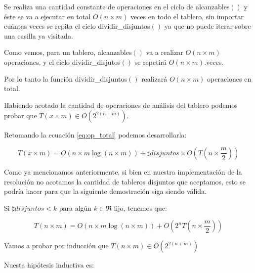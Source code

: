 \documentclass[a4paper, 12pt] {article}
\begin{document}
Se realiza una cantidad constante de operaciones en el ciclo de alcanzables$\left( \right) $ y \'este se va a ejecutar en total $O\left( n\times m\right) $ veces en todo el tablero, sin importar cu\'antas veces se repita el ciclo dividir\_disjuntos$\left( \right) $ ya que no puede iterar sobre una casilla ya visitada.

Como vemos, para un tablero, alcanzables$\left( \right) $ va a realizar $O\left( n \times m\right) $ operaciones, y el ciclo dividir\_disjutos$\left( \right) $ se repetir\'a $O\left( n\times m\right) $.veces.

Por lo tanto la funci\'on dividir\_disjuntos$\left( \right) $ realizar\'a $O\left( n \times m\right) $ operaciones en total.	


Habiendo acotado la cantidad de operaciones de an\'alisis del tablero podemos probar que $T\left( x \times m\right) \in O\left( 2^{2\left( n+m\right) }\right) $.

Retomando la ecuaci\'on \ref{eq:op_total} podemos desarrollarla:

\begin{equation}
T\left( x \times m\right) = O\left( n\times m \log \left( n\times m\right) \right) + \sharp disjuntos \times O \left( T\left( n \times \frac{m}{2} \right) \right) 
\end{equation}
 

Como ya mencionamos anteriormente, si bien en nuestra implementaci\'on de la resoluci\'on no acotamos la cantidad de tableros disjuntos que aceptamos, esto se podr\'ia hacer para que la siguiente demostraci\'on siga siendo v\'alida.


Si $\sharp disjuntos < k$ para alg\'un  $k \in \Re$  fijo, tenemos que:

\begin{equation} \label{eq:op_total_cota_disjuntos}
T\left( n \times m\right) = O\left( n\times m \log \left( n\times m\right) \right) + O \left( 2^{n}T\left( n \times \frac{m}{2} \right) \right) 
\end{equation}

Vamos a probar por inducci\'on que $\textstyle T\left( n \times m \right) \in O\left( 2^{2\left( n+m\right)  }\right)$


Nuesta hip\'otesis inductiva es:
\end{document}
